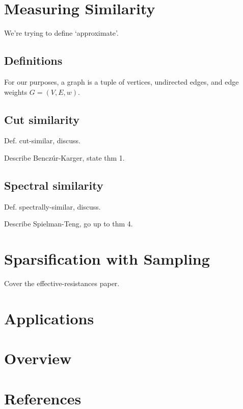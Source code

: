 \documentclass{article}
\begin{document}
\section{Measuring Similarity}

We're trying to define `approximate'.

\subsection{Definitions}

For our purposes, a graph is a tuple of vertices, undirected edges, and edge
weights $G = (V, E, w)$. 

\subsection{Cut similarity}

Def. cut-similar, discuss.

Describe Benczúr-Karger, state thm 1.

\subsection{Spectral similarity}

Def. spectrally-similar, discuss.

Describe Spielman-Teng, go up to thm 4.

\section{Sparsification with Sampling}

Cover the effective-resistances paper.

\section{Applications}

\section{Overview}

\section*{References}
\end{document}
